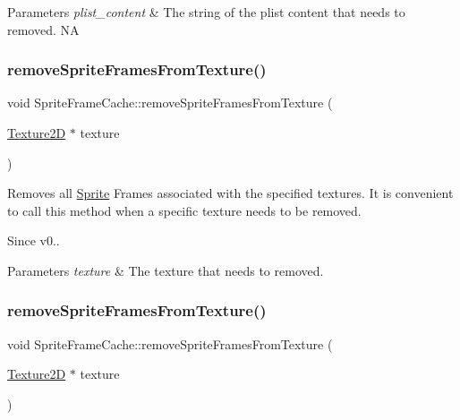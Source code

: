\begin{DoxyParams}{Parameters}
{\em plist\+\_\+content} & The string of the plist content that needs to removed.  NA \\
\hline
\end{DoxyParams}
\mbox{\label{classSpriteFrameCache_a410989581ec0f9da9914b512d672e2dc}} 
\subsubsection{\texorpdfstring{remove\+Sprite\+Frames\+From\+Texture()}{removeSpriteFramesFromTexture()}\hspace{0.1cm}{\footnotesize\ttfamily [1/2]}}
{\footnotesize\ttfamily void Sprite\+Frame\+Cache\+::remove\+Sprite\+Frames\+From\+Texture (\begin{DoxyParamCaption}\item[{\hyperlink{classTexture2D}{Texture2D} $\ast$}]{texture }\end{DoxyParamCaption})}

Removes all \hyperlink{classSprite}{Sprite} Frames associated with the specified textures. It is convenient to call this method when a specific texture needs to be removed. \begin{DoxySince}{Since}
v0..
\end{DoxySince}

\begin{DoxyParams}{Parameters}
{\em texture} & The texture that needs to removed. \\
\hline
\end{DoxyParams}
\mbox{\label{classSpriteFrameCache_a410989581ec0f9da9914b512d672e2dc}} 
\subsubsection{\texorpdfstring{remove\+Sprite\+Frames\+From\+Texture()}{removeSpriteFramesFromTexture()}\hspace{0.1cm}{\footnotesize\ttfamily [2/2]}}
{\footnotesize\ttfamily void Sprite\+Frame\+Cache\+::remove\+Sprite\+Frames\+From\+Texture (\begin{DoxyParamCaption}\item[{\hyperlink{classTexture2D}{Texture2D} $\ast$}]{texture }\end{DoxyParamCaption})}

